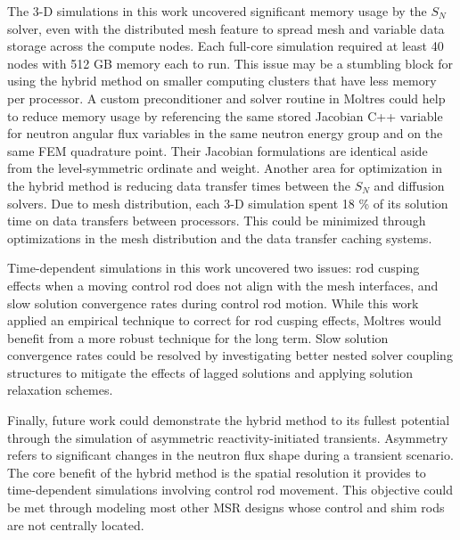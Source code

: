 The 3-D simulations in this work uncovered significant memory usage by the $S_N$ solver, even
with the distributed mesh feature to spread mesh and variable data storage across the compute nodes.
Each full-core simulation required at least 40 nodes with 512 GB memory each to run.
This issue may be a stumbling block for using the hybrid method on smaller computing clusters that
have less memory per processor. A custom preconditioner and solver routine in Moltres could help to
reduce memory usage by referencing the same stored Jacobian C++ variable for neutron angular flux
variables in the same neutron energy group and on the same \gls{FEM} quadrature point. Their
Jacobian formulations are identical aside from the level-symmetric ordinate and weight. Another
area for optimization in the hybrid method is reducing data transfer times between the $S_N$ and
diffusion solvers. Due to mesh distribution, each 3-D simulation spent 18 \% of its solution time
on data transfers between processors. This could be minimized through optimizations in the mesh
distribution and the data transfer caching systems.

Time-dependent simulations in this work uncovered two issues: rod cusping effects when a moving
control rod does not align with the mesh interfaces, and slow solution convergence rates during
control rod motion. While this work applied an empirical technique to correct for rod cusping
effects, Moltres would benefit from a more robust technique for the long term. Slow solution
convergence rates could be resolved by investigating better nested solver coupling structures to
mitigate the effects of lagged solutions and applying solution relaxation schemes.

Finally, future work could demonstrate the hybrid method to its fullest potential through the
simulation of asymmetric reactivity-initiated transients. Asymmetry refers to significant changes
in the neutron flux shape during a transient scenario. The core benefit of the hybrid method is
the spatial resolution it provides to time-dependent simulations involving control rod movement.
This objective could be met through modeling most other \gls{MSR} designs whose control and shim
rods are not centrally located.
